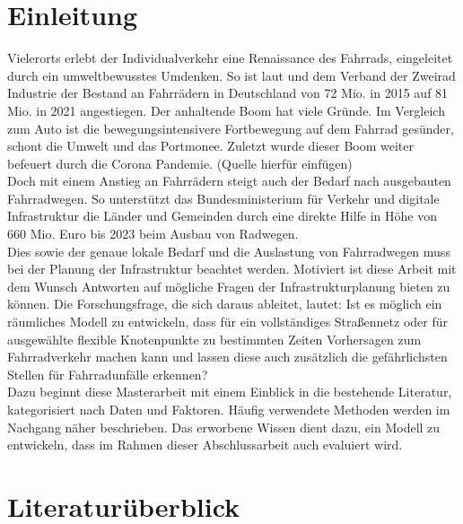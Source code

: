 \documentclass[a4paper,12pt]{thesis}
\begin{document}
\begingroup
\let\clearpage\relax
\listoffigures
\listoftables
\endgroup

\chapter{Einleitung}

Vielerorts erlebt der Individualverkehr eine Renaissance des Fahrrads, eingeleitet durch ein umweltbewusstes Umdenken. So ist laut \cite{Eisenberger2015} und dem Verband der Zweirad Industrie \cite{ZIV2022} der Bestand an Fahrrädern in Deutschland von 72 Mio. in 2015 auf 81 Mio. in 2021 angestiegen. Der anhaltende Boom hat viele Gründe. Im Vergleich zum Auto ist die bewegungsintensivere Fortbewegung auf dem Fahrrad gesünder, schont die Umwelt und das Portmonee. Zuletzt wurde dieser Boom weiter befeuert durch die Corona Pandemie. (Quelle hierfür einfügen) \\
Doch mit einem Anstieg an Fahrrädern steigt auch der Bedarf nach ausgebauten Fahrradwegen. So unterstützt das Bundesministerium für Verkehr und digitale Infrastruktur \cite{VerkehrunddigitaleInfrastruktur2020} die Länder und Gemeinden durch eine direkte Hilfe in Höhe von 660 Mio. Euro bis 2023 beim Ausbau von Radwegen.\\
Dies sowie der genaue lokale Bedarf und die Auslastung von Fahrradwegen muss bei der Planung der Infrastruktur beachtet werden. Motiviert ist diese Arbeit mit dem Wunsch Antworten auf mögliche Fragen der Infrastrukturplanung bieten zu können. Die Forschungsfrage, die sich daraus ableitet, lautet: Ist es möglich ein räumliches Modell zu entwickeln, dass für ein vollständiges Straßennetz oder für ausgewählte flexible Knotenpunkte zu bestimmten Zeiten Vorhersagen zum Fahrradverkehr machen kann und lassen diese auch zusätzlich die gefährlichsten Stellen für Fahrradunfälle erkennen?\\
Dazu beginnt diese Masterarbeit mit einem Einblick in die bestehende Literatur, kategorisiert nach Daten und Faktoren. Häufig verwendete Methoden werden im Nachgang näher beschrieben. Das erworbene Wissen dient dazu, ein Modell zu entwickeln, dass im Rahmen dieser Abschlussarbeit auch evaluiert wird.

\chapter{Literaturüberblick}
\end{document}
